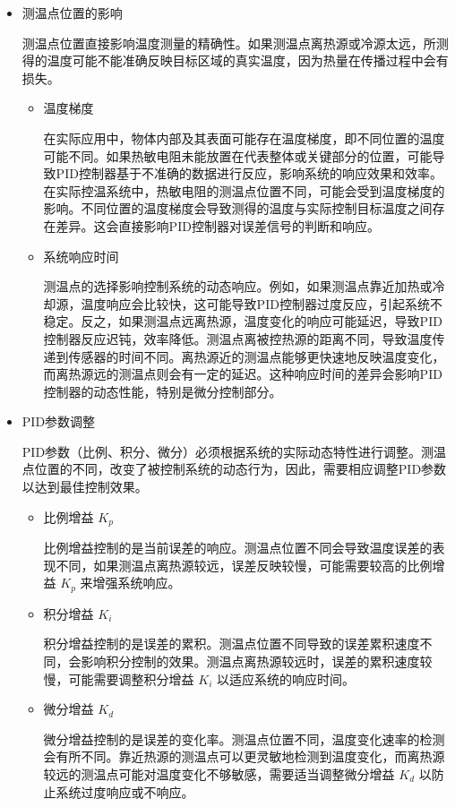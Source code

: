 \documentclass[dvipsnames, svgnames,a4paper,11pt]{article}
\begin{document}
	\begin{itemize}
		\item 测温点位置的影响
		
		测温点位置直接影响温度测量的精确性。如果测温点离热源或冷源太远，所测得的温度可能不能准确反映目标区域的真实温度，因为热量在传播过程中会有损失。
		
		\begin{itemize}
			\item 温度梯度
			
			在实际应用中，物体内部及其表面可能存在温度梯度，即不同位置的温度可能不同。如果热敏电阻未能放置在代表整体或关键部分的位置，可能导致PID控制器基于不准确的数据进行反应，影响系统的响应效果和效率。在实际控温系统中，热敏电阻的测温点位置不同，可能会受到温度梯度的影响。不同位置的温度梯度会导致测得的温度与实际控制目标温度之间存在差异。这会直接影响PID控制器对误差信号的判断和响应。
			
			\item 系统响应时间
			
			测温点的选择影响控制系统的动态响应。例如，如果测温点靠近加热或冷却源，温度响应会比较快，这可能导致PID控制器过度反应，引起系统不稳定。反之，如果测温点远离热源，温度变化的响应可能延迟，导致PID控制器反应迟钝，效率降低。测温点离被控热源的距离不同，导致温度传递到传感器的时间不同。离热源近的测温点能够更快速地反映温度变化，而离热源远的测温点则会有一定的延迟。这种响应时间的差异会影响PID控制器的动态性能，特别是微分控制部分。
			
		\end{itemize}
		
		\item PID参数调整
		
		PID参数（比例、积分、微分）必须根据系统的实际动态特性进行调整。测温点位置的不同，改变了被控制系统的动态行为，因此，需要相应调整PID参数以达到最佳控制效果。
		
		\begin{itemize}
			\item 比例增益 \( K_p \)
			
			比例增益控制的是当前误差的响应。测温点位置不同会导致温度误差的表现不同，如果测温点离热源较远，误差反映较慢，可能需要较高的比例增益 \( K_p \) 来增强系统响应。
			
			\item 积分增益 \( K_i \)
			
			积分增益控制的是误差的累积。测温点位置不同导致的误差累积速度不同，会影响积分控制的效果。测温点离热源较远时，误差的累积速度较慢，可能需要调整积分增益 \( K_i \) 以适应系统的响应时间。
			
			\item 微分增益 \( K_d \)
			
			微分增益控制的是误差的变化率。测温点位置不同，温度变化速率的检测会有所不同。靠近热源的测温点可以更灵敏地检测到温度变化，而离热源较远的测温点可能对温度变化不够敏感，需要适当调整微分增益 \( K_d \) 以防止系统过度响应或不响应。
			
		\end{itemize}
	\end{itemize}
	
\end{document}
